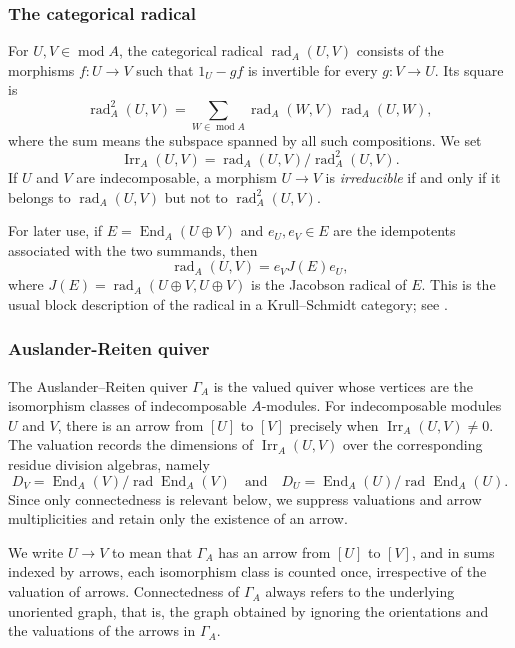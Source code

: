 \documentclass[11pt,letterpaper,reqno]{amsart}
\theoremstyle{definition}
\DeclareMathOperator{\End}{End}
\DeclareMathOperator{\Irr}{Irr}
\DeclareMathOperator{\rad}{rad}
\newcommand{\modcat}{\operatorname{mod}}
\begin{document}
\subsubsection{The categorical radical}
For $U,V\in\modcat A$, the categorical radical
$\rad_A(U,V)$ consists of the morphisms $f:U\to V$ such that
$1_U-gf$ is invertible for every $g:V\to U$.  Its square is
\[
\rad_A^2(U,V)
 =\sum_{W\in\modcat A}
 \rad_A(W,V)\,\rad_A(U,W),
\]
where the sum means the subspace spanned by all such compositions.  We set
\[
\Irr_A(U,V)=\rad_A(U,V)/\rad_A^2(U,V).
\]
If $U$ and $V$ are indecomposable, a morphism $U\to V$ is \emph{irreducible} if
and only if it belongs to $\rad_A(U,V)$ but not to
$\rad_A^2(U,V)$.  


For later use, if $E=\End_A(U\oplus V)$ and $e_U,e_V\in E$ are the
idempotents associated with the two summands, then
\begin{equation}\label{eq:radical-block}
\rad_A(U,V)=e_VJ(E)e_U,
\end{equation}
where $J(E)=\rad_A(U\oplus V,U\oplus V)$ is the Jacobson radical of $E$.
This is the usual block description of the radical in a Krull--Schmidt
category; see \cite[Chapter~I, Section~2]{ARS}.

\subsubsection{Auslander-Reiten quiver}
The Auslander--Reiten quiver $\Gamma_A$ is the valued quiver whose vertices are the isomorphism classes of indecomposable $A$-modules. For indecomposable modules $U$ and $V$, there is an arrow from $[U]$ to $[V]$ precisely when $\Irr_A(U,V)\neq 0$. The valuation records the dimensions of $\Irr_A(U,V)$ over the corresponding residue division algebras, namely
$$
  D_V = \End_A(V)/\rad\End_A(V)
  \quad\text{and}\quad
  D_U = \End_A(U)/\rad\End_A(U).
$$
Since only connectedness is relevant below, we suppress valuations and arrow multiplicities and retain only the existence of an arrow.


We write $U\longrightarrow V$
to mean that $\Gamma_A$ has an arrow from $[U]$ to $[V]$, and in sums indexed
by arrows, each isomorphism class is counted once, irrespective of the
valuation of arrows. Connectedness of $\Gamma_A$ always refers to the
underlying unoriented graph, that is, the graph obtained by ignoring the orientations and the valuations of the arrows in $\Gamma_A$. 

\end{document}
